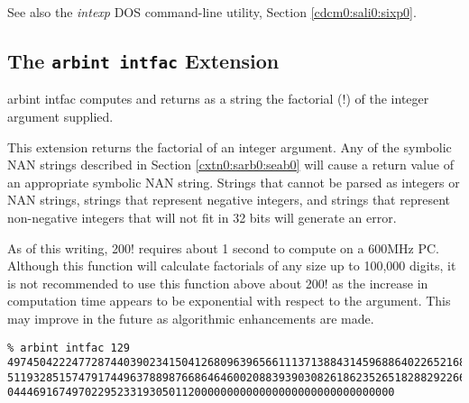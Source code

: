 \begin{tclcommandseealso}
See also the \emph{intexp} DOS command-line utility, 
Section \ref{cdcm0:sali0:sixp0}.
\end{tclcommandseealso}


\subsection{The \texttt{arbint intfac} Extension}
\label{cxtn0:sarb0:sfac0}

\begin{tclcommandname}{arbint intfac}%
computes and returns as a string the factorial ($!$) of
the integer argument supplied.
\end{tclcommandname}

\begin{tclcommandsynopsis}
\end{tclcommandsynopsis}

\begin{tclcommanddescription}
This extension returns the factorial of an integer argument.
Any of the symbolic NAN strings described in 
Section \ref{cxtn0:sarb0:seab0} will cause a return
value of an appropriate symbolic NAN string.
Strings that cannot be parsed as integers or 
NAN strings, strings 
that represent negative integers, and strings that represent
non-negative integers that will not fit in 32 bits will generate
an error.

As of this writing, 200! requires about 1 second to compute on a
600MHz PC.  Although this function will calculate factorials of any size
up to 100,000 digits, it is not recommended to use this function above 
about 200! as the increase in computation time appears to be exponential
with respect to the argument.  This may improve in the future as algorithmic
enhancements are made.
\end{tclcommanddescription}

\begin{tclcommandsampleinvocations}
\begin{scriptsize}
\begin{verbatim}
% arbint intfac 129
4974504222477287440390234150412680963965661113713884314596886402265216893219635
5119328515747917449637889876686464600208839390308261862352651828829226610077151
044469167497022952331930501120000000000000000000000000000000
\end{verbatim}
\end{scriptsize}
\end{tclcommandsampleinvocations}

